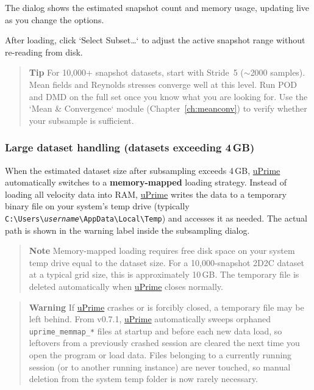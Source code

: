 The dialog shows the estimated snapshot count and memory usage, updating live as you change the options.

After loading, click `Select Subset\ldots` to adjust the active snapshot range without re-reading from disk.

\begin{quote}
\textbf{Tip}
For 10,000+ snapshot datasets, start with Stride~5 ($\sim$2000 samples). Mean fields and Reynolds stresses converge well at this level. Run POD and DMD on the full set once you know what you are looking for. Use the `Mean \& Convergence` module (Chapter~\ref{ch:meanconv}) to verify whether your subsample is sufficient.
\end{quote}

\subsubsection{Large dataset handling (datasets exceeding 4\,GB)}

When the estimated dataset size after subsampling exceeds 4\,GB, \href{https://cmdrryder.github.io/uPrime/}{uPrime} automatically switches to a \textbf{memory-mapped} loading strategy. Instead of loading all velocity data into RAM, \href{https://cmdrryder.github.io/uPrime/}{uPrime} writes the data to a temporary binary file on your system's temp drive (typically \texttt{C:\textbackslash Users\textbackslash \textit{username}\textbackslash AppData\textbackslash Local\textbackslash Temp}) and accesses it as needed. The actual path is shown in the warning label inside the subsampling dialog.

\begin{quote}
\textbf{Note}
Memory-mapped loading requires free disk space on your system temp drive equal to the dataset size. For a 10,000-snapshot 2D2C dataset at a typical grid size, this is approximately 10\,GB. The temporary file is deleted automatically when \href{https://cmdrryder.github.io/uPrime/}{uPrime} closes normally.
\end{quote}

\begin{quote}
\textbf{Warning}
If \href{https://cmdrryder.github.io/uPrime/}{uPrime} crashes or is forcibly closed, a temporary file may be left behind. From v0.7.1, \href{https://cmdrryder.github.io/uPrime/}{uPrime} automatically sweeps orphaned \texttt{uprime\_memmap\_*} files at startup and before each new data load, so leftovers from a previously crashed session are cleared the next time you open the program or load data. Files belonging to a currently running session (or to another running instance) are never touched, so manual deletion from the system temp folder is now rarely necessary.
\end{quote}

